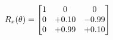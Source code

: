 \documentclass[preview]{standalone}
\begin{document}
\begin{align*}
\special{dvisvgm:raw <g id='unique000'>}R_{x}(\theta) = \begin{bmatrix}1 & 0 & 0 \\0 & +0.10 & -0.99 \\0 & +0.99 & +0.10\end{bmatrix}\special{dvisvgm:raw </g>}
\end{align*}
\end{document}
